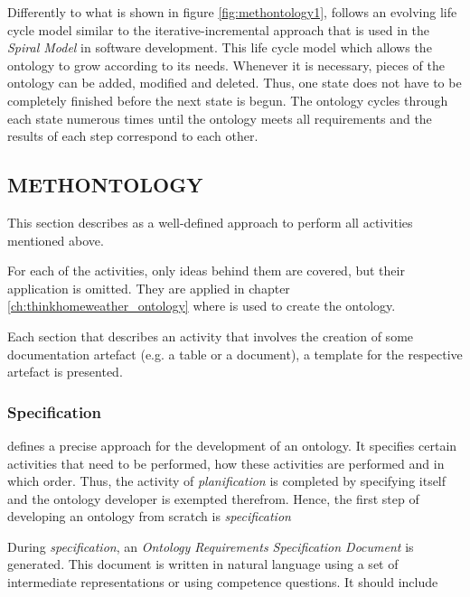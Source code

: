 Differently to what is shown in figure \ref{fig:methontology1}, \methontology follows an evolving life cycle model similar to the iterative-incremental approach that is used in the \emph{Spiral Model} in software development\cite{spiral_model}. This life cycle model which allows the ontology to grow according to its needs. Whenever it is necessary, pieces of the ontology can be added, modified and deleted. Thus, one state does not have to be completely finished before the next state is begun. The ontology cycles through each state numerous times until the ontology meets all requirements and the results of each step correspond to each other.

\subsection{METHONTOLOGY}
\label{sec:methontology}

This section describes \methontology as a well-defined approach to perform all activities mentioned above.

For each of the activities, only ideas behind them are covered, but their application is omitted. They are applied in chapter \ref{ch:thinkhomeweather_ontology} where \methontology is used to create the \thinkhomeweather ontology.

Each section that describes an activity that involves the creation of some documentation artefact (e.g. a table or a document), a template for the respective artefact is presented.

\subsubsection{Specification}
\label{subsec:methontology_specification}

\methontology defines a precise approach for the development of an ontology. It specifies certain activities that need to be performed, how these activities are performed and in which order. Thus, the activity of \emph{planification} is completed by specifying \methontology itself and the ontology developer is exempted therefrom. Hence, the first step of developing an ontology from scratch is \emph{specification}

During \emph{specification}, an \emph{Ontology Requirements Specification Document} is generated. This document is written in natural language using a set of intermediate representations or using competence questions. It should include

